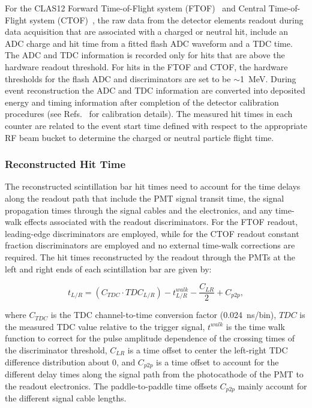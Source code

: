 \documentclass{elsart}
\begin{document}
For the CLAS12 Forward Time-of-Flight system (FTOF)~\cite{ftof-nim} and Central Time-of-Flight system
(CTOF)~\cite{ctof-nim}, the raw data from the detector elements readout during data acquisition that are
associated with a charged or neutral hit, include an ADC charge and hit time from a fitted flash ADC waveform
and a TDC time. The ADC and TDC information is recorded only for hits that are above the hardware readout
threshold. For hits in the FTOF and CTOF, the hardware thresholds for the flash ADC and discriminators are set
to be $\sim$1~MeV. During event reconstruction the ADC and TDC information are converted into deposited energy
and timing information after completion of the detector calibration procedures (see Refs.~\cite{ftof-nim,ctof-nim}
for calibration details). The measured hit times in each counter are related to the event start time defined with
respect to the appropriate RF beam bucket to determine the charged or neutral particle flight time.

\subsubsection{Reconstructed Hit Time}
\label{rec:time}

The reconstructed scintillation bar hit times need to account for the time delays along the readout path that
include the PMT signal transit time, the signal propagation times through the signal cables and the electronics, 
and any time-walk effects associated with the readout discriminators. For the FTOF readout, leading-edge
discriminators are employed, while for the CTOF readout constant fraction discriminators are employed and no
external time-walk corrections are required. The hit times reconstructed by the readout through the PMTs at
the left and right ends of each scintillation bar are given by:

\begin{equation}
t_{L/R} = (C_{TDC} \cdot TDC_{L/R}) - t_{L/R}^{walk} - \frac{C_{LR}}{2} + C_{p2p},
\end{equation}

\noindent
where $C_{TDC}$ is the TDC channel-to-time conversion factor (0.024~ns/bin), $TDC$ is the measured TDC value
relative to the trigger signal, $t^{walk}$ is the time walk function to correct for the pulse amplitude dependence of
the crossing times of the discriminator threshold, $C_{LR}$ is a time offset to center the left-right TDC difference
distribution about 0, and $C_{p2p}$ is a time offset to account for the different delay times along the signal path from
the photocathode of the PMT to the readout electronics. The paddle-to-paddle time offsets $C_{p2p}$ mainly account
for the different signal cable lengths.
\end{document}
